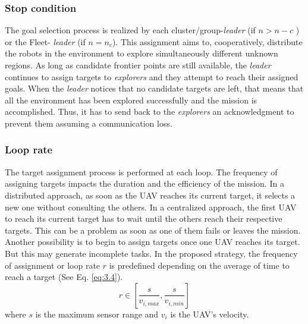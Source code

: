 \documentclass[11pt,openany]{book}
\begin{document}
\subsubsection{Stop condition}
The goal selection process is realized by each cluster/group-\textit{leader} (if $n>n-c$ ) or the Fleet- \textit{leader} (if $n=n_c$). This assignment aims to, cooperatively, distribute the robots in the environment to explore simultaneously different unknown regions. As long as candidate frontier points are still available, the \textit{leader} continues to assign targets to \textit{explorers} and they attempt to reach their assigned goals. When the \textit{leader} notices that no candidate targets are left, that means that all the environment has been explored successfully and the mission is accomplished. Thus, it has to send back to the \textit{explorers} an acknowledgment to prevent them assuming a communication loss.
\subsubsection{Loop rate}
The target assignment process is performed at each loop. The frequency of assigning targets impacts the duration and the eﬃciency of the mission. In a distributed approach, as soon as the UAV reaches its current target, it selects a new one without consulting the others. In a centralized approach, the first UAV to reach its current target has to wait until the others reach their respective targets. This can be a problem as soon as one of them fails or leaves the mission. Another possibility is to begin to assign targets once one UAV reaches its target. But this may generate incomplete tasks. In the proposed strategy, the frequency of assignment or loop rate $r$ is predefined depending on the average of time to reach a target (See Eq. \ref{eq:3.4}).
\begin{equation} \label{eq:3.4}
    r \in [\frac{s}{v_{i,max}},\frac{s}{v_{i,min}}]
\end{equation}
where $s$ is the maximum sensor range and $v_i$ is the UAV's velocity.
\end{document}
